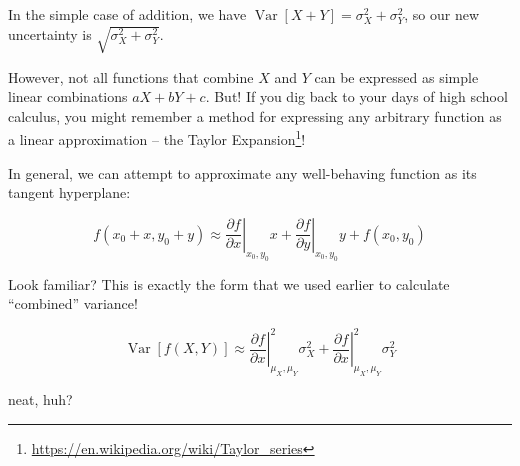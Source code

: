 \documentclass[]{article}
\renewcommand{\href}[2]{#2\footnote{\url{#1}}}
\begin{document}
In the simple case of addition, we have
\(\operatorname{Var}[X + Y] = \sigma_X^2 + \sigma_Y^2\), so our new
uncertainty is \(\sqrt{\sigma_X^2 + \sigma_Y^2}\).

However, not all functions that combine \(X\) and \(Y\) can be expressed
as simple linear combinations \(aX + bY + c\). But! If you dig back to
your days of high school calculus, you might remember a method for
expressing any arbitrary function as a linear approximation -- the
\href{https://en.wikipedia.org/wiki/Taylor_series}{Taylor Expansion}!

In general, we can attempt to approximate any well-behaving function as
its tangent hyperplane:

\[
f(x_0 + x, y_0 + y) \approx
\left.\frac{\partial f}{\partial x}\right\vert_{x_0, y_0} x + 
\left.\frac{\partial f}{\partial y}\right\vert_{x_0, y_0} y + 
f(x_0, y_0)
\]

Look familiar? This is exactly the form that we used earlier to
calculate ``combined'' variance!

\[
\operatorname{Var}[f(X,Y)] \approx 
\left.\frac{\partial f}{\partial x}\right\vert_{\mu_X, \mu_Y}^2 \sigma_X^2 +
\left.\frac{\partial f}{\partial x}\right\vert_{\mu_X, \mu_Y}^2 \sigma_Y^2
\]

neat, huh?
\end{document}
